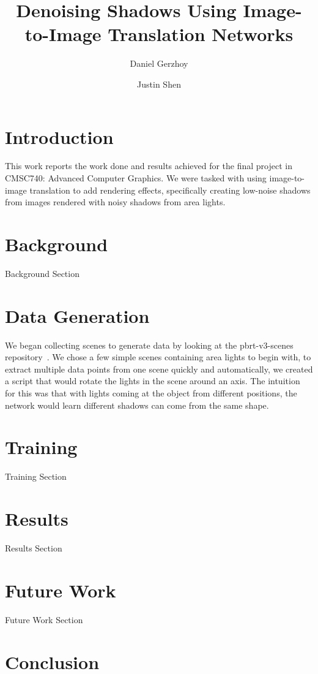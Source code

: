 \documentclass[acmsmall]{acmart}
\begin{document}
\title{Denoising Shadows Using Image-to-Image Translation Networks}

\author{Daniel Gerzhoy}
\author{Justin Shen}
\maketitle

\section{Introduction}
\label{sec:intro}

This work reports the work done and results achieved for the final project in CMSC740: Advanced Computer Graphics. We were tasked with using image-to-image translation to add rendering effects, specifically creating low-noise shadows from images rendered with noisy shadows from area lights.

\section{Background}
\label{sec:background}

Background Section

\section{Data Generation}
\label{sec:datagen}

We began collecting scenes to generate data by looking at the pbrt-v3-scenes repository~\cite{scenes}. We chose a few simple scenes containing area lights to begin with, to extract multiple data points from one scene quickly and automatically, we created a script that would rotate the lights in the scene around an axis. The intuition for this was that with lights coming at the object from different positions, the network would learn different shadows can come from the same shape.

\section{Training}
\label{sec:train}

Training Section

\section{Results}
\label{sec:results}

Results Section

\section{Future Work}
\label{sec:future}

Future Work Section

\section{Conclusion}
\label{sec:conclusion}



\end{document}
